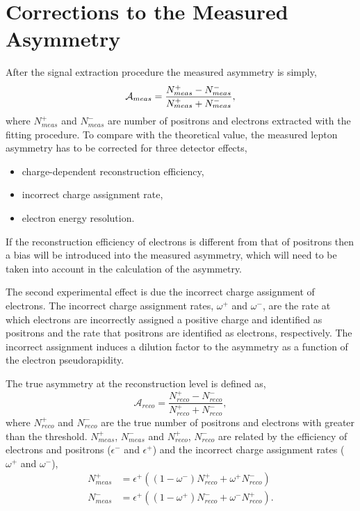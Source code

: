 \section{Corrections to the Measured Asymmetry}
After the signal extraction procedure the measured asymmetry is simply,
\begin{equation}
\mathcal{A}_{meas} = \frac{
\label{eq:meas}
  N_{meas}^{+} -
  N_{meas}^{-}
}
{
  N_{meas}^{+} +
  N_{meas}^{-}
},
\end{equation}
where $N_{meas}^{+}$ and $N_{meas}^{-}$ are number of positrons and
electrons extracted with the fitting procedure.
To compare with the theoretical value, the measured lepton asymmetry has to be
corrected for three detector effects,
\begin{itemize}
\item charge-dependent reconstruction efficiency,
\item incorrect charge assignment rate,
\item electron energy resolution.
\end{itemize}

If the reconstruction efficiency of electrons is different from that of positrons
then a bias will be introduced into the measured asymmetry, which will need to
be taken into account in the calculation of the asymmetry.  

The second experimental effect is due the incorrect charge assignment of electrons.
The incorrect charge assignment rates, $\omega^+$ and $\omega^-$, are the rate
at which electrons are incorrectly assigned a positive charge and identified as
positrons and the rate that positrons are identified as electrons, respectively.  The
incorrect assignment induces a dilution factor to the asymmetry as a function of
the electron pseudorapidity. 

The true asymmetry at the reconstruction level is defined as,
\begin{equation}
\label{eq:reco}
\mathcal{A}_{reco} = \frac{
  N_{reco}^{+} -
  N_{reco}^{-}
}
{
  N_{reco}^{+} +
  N_{reco}^{-}
},
\end{equation}
where $N_{reco}^{+}$ and $N_{reco}^{-}$ are the true number of positrons and
electrons with \pT greater than the threshold.  $N_{meas}^{+}$, $N_{meas}^{-}$
and $N_{reco}^{+}$, $N_{reco}^{-}$ are related by the efficiency of electrons
and positrons ($\epsilon^{-}$ and $\epsilon^{+}$) and the incorrect charge
assignment rates ($\omega^{+}$ and $\omega^{-}$),
\begin{align}
  \label{eq:poscor}
  N_{meas}^{+} 
  &= \epsilon^+ \left( ( 1 - \omega^- ) N_{reco}^{+} + \omega^+ N_{reco}^{-} \right)\\
  \label{eq:negcor}
  N_{meas}^{-} 
  &= \epsilon^+ \left( ( 1 - \omega^+ ) N_{reco}^{-} + \omega^- N_{reco}^{+} \right).
\end{align}

